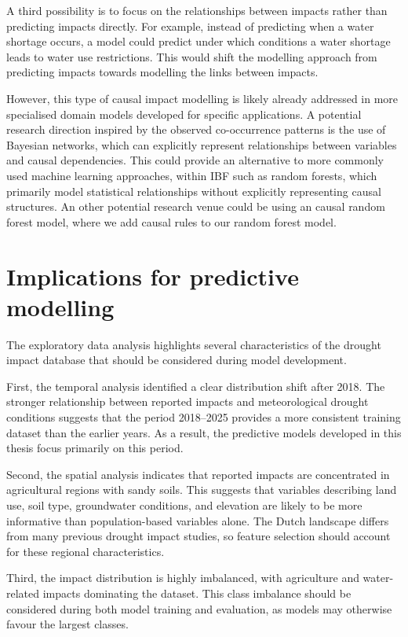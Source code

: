A third possibility is to focus on the relationships between impacts rather than predicting impacts directly. For example, instead of predicting when a water shortage occurs, a model could predict under which conditions a water shortage leads to water use restrictions. This would shift the modelling approach from predicting impacts towards modelling the links between impacts.

However, this type of causal impact modelling is likely already addressed in more specialised domain models developed for specific applications. A potential research direction inspired by the observed co-occurrence patterns is the use of Bayesian networks, which can explicitly represent relationships between variables and causal dependencies. This could provide an alternative to more commonly used machine learning approaches, within IBF such as random forests, which primarily model statistical relationships without explicitly representing causal structures. An other potential research venue could be using an causal random forest model, where we add causal rules to our random forest model.

\section{Implications for predictive modelling}

The exploratory data analysis highlights several characteristics of the drought impact database that should be considered during model development.

First, the temporal analysis identified a clear distribution shift after 2018. The stronger relationship between reported impacts and meteorological drought conditions suggests that the period 2018--2025 provides a more consistent training dataset than the earlier years. As a result, the predictive models developed in this thesis focus primarily on this period.

Second, the spatial analysis indicates that reported impacts are concentrated in agricultural regions with sandy soils. This suggests that variables describing land use, soil type, groundwater conditions, and elevation are likely to be more informative than population-based variables alone. The Dutch landscape differs from many previous drought impact studies, so feature selection should account for these regional characteristics.

Third, the impact distribution is highly imbalanced, with agriculture and water-related impacts dominating the dataset. This class imbalance should be considered during both model training and evaluation, as models may otherwise favour the largest classes.

